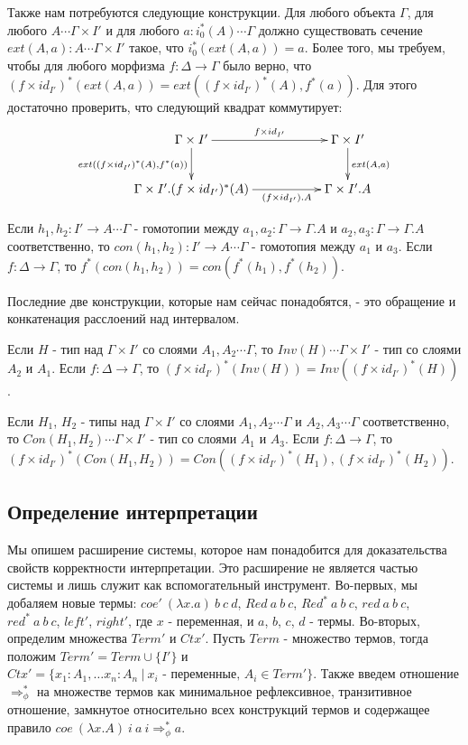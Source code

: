 \documentclass{amsart}
\theoremstyle{definition}
\theoremstyle{remark}
\newcommand{\red}{\Rightarrow}
\newcommand{\deq}{\Leftrightarrow}
\numberwithin{figure}{section}
\begin{document}
Также нам потребуются следующие конструкции.
Для любого объекта $\Gamma$, для любого $A \dotsb \Gamma \times I'$ и для любого $a : i_0^*(A) \dotsb \Gamma$ должно существовать сечение $ext(A,a) : A \dotsb \Gamma \times I'$ такое, что $i_0^*(ext(A,a)) = a$.
Более того, мы требуем, чтобы для любого морфизма $f : \Delta \to \Gamma$ было верно, что $(f \times id_{I'})^*(ext(A,a)) = ext((f \times id_{I'})^*(A), f^*(a))$.
Для этого достаточно проверить, что следующий квадрат коммутирует:
\[ \xymatrix{ \Gamma \times I' \ar[rr]^{f \times id_{I'}} \ar[d]_{ext((f \times id_{I'})^*(A), f^*(a))} & & \Gamma \times I' \ar[d]^{ext(A,a)} \\
              \Gamma \times I'.(f \times id_{I'})^*(A) \ar[rr]_-{(f \times id_{I'}).A}                  & & \Gamma \times I'.A
            } \]

Если $h_1, h_2 : I' \to A \dotsb \Gamma$ - гомотопии между $a_1, a_2 : \Gamma \to \Gamma.A$ и $a_2, a_3 : \Gamma \to \Gamma.A$ соответственно,
    то $con(h_1, h_2) : I' \to A \dotsb \Gamma$ - гомотопия между $a_1$ и $a_3$.
Если $f : \Delta \to \Gamma$, то $f^*(con(h_1, h_2)) = con(f^*(h_1), f^*(h_2))$.

Последние две конструкции, которые нам сейчас понадобятся, - это обращение и конкатенация расслоений над интервалом.

Если $H$ - тип над $\Gamma \times I'$ со слоями $A_1, A_2 \dotsb \Gamma$, то $Inv(H) \dotsb \Gamma \times I'$ - тип со слоями $A_2$ и $A_1$.
Если $f : \Delta \to \Gamma$, то $(f \times id_{I'})^*(Inv(H)) = Inv((f \times id_{I'})^*(H))$.

Если $H_1$, $H_2$ - типы над $\Gamma \times I'$ со слоями $A_1, A_2 \dotsb \Gamma$ и $A_2, A_3 \dotsb \Gamma$ соответственно, то $Con(H_1, H_2) \dotsb \Gamma \times I'$ - тип со слоями $A_1$ и $A_3$.
Если $f : \Delta \to \Gamma$, то $(f \times id_{I'})^*(Con(H_1, H_2)) = Con((f \times id_{I'})^*(H_1), (f \times id_{I'})^*(H_2))$.

\subsection{Определение интерпретации}

Мы опишем расширение системы, которое нам понадобится для доказательства свойств корректности интерпретации.
Это расширение не является частью системы и лишь служит как вспомогательный инструмент.
Во-первых, мы добаляем новые термы: $coe'\ (\lambda x. a)\ b\ c\ d$, $Red\ a\ b\ c$, $Red^*\ a\ b\ c$, $red\ a\ b\ c$, $red^*\ a\ b\ c$, $left'$, $right'$, где $x$ - переменная, и $a$, $b$, $c$, $d$ - термы.
Во-вторых, определим множества $Term'$ и $Ctx'$.
Пусть $Term$ - множество термов, тогда положим $Term' = Term \cup \{ I' \}$ и $Ctx' = \{ x_1 : A_1, \ldots x_n : A_n\ |\ x_i \text{ - переменные, } A_i \in Term' \}$.
Также введем отношение $\red^*_\phi$ на множестве термов как минимальное рефлексивное, транзитивное отношение, замкнутое относительно всех конструкций термов и содержащее правило $coe\ (\lambda x. A)\ i\ a\ i \red^*_\phi a$.
\end{document}
